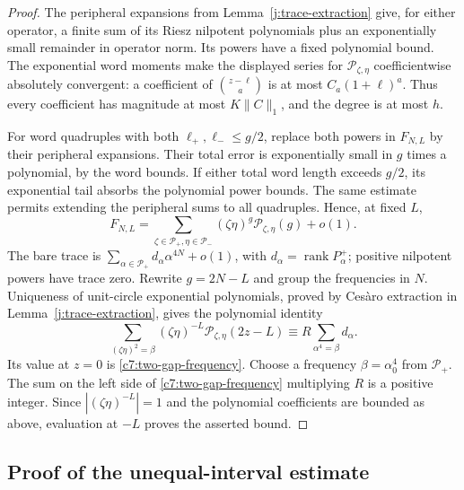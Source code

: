 \begin{proof}
The peripheral expansions from Lemma~\ref{j:trace-extraction} give,
for either operator, a finite sum of its Riesz nilpotent polynomials
plus an exponentially small remainder in operator norm. Its powers
have a fixed polynomial bound. The exponential word moments make the
displayed series for $\mathscr P_{\zeta,\eta}$ coefficientwise
absolutely convergent: a coefficient of $\binom{z-\ell}{a}$ is at most
$C_a(1+\ell)^a$. Thus every coefficient has magnitude at most
$K\|C\|_1$, and the degree is at most $h$.

For word quadruples with both $\ell_+,\ell_-\le g/2$, replace both
powers in $F_{N,L}$ by their peripheral expansions. Their total error
is exponentially small in $g$ times a polynomial, by the word bounds.
If either total word length exceeds $g/2$, its exponential tail absorbs
the polynomial power bounds. The same estimate permits extending the
peripheral sums to all quadruples. Hence, at fixed $L$,
\[
 F_{N,L}=\sum_{\zeta\in\mathcal P_+,\eta\in\mathcal P_-}
           (\zeta\eta)^g\mathscr P_{\zeta,\eta}(g)+o(1).
\]
The bare trace is
$\sum_{\alpha\in\mathcal P_+}d_\alpha\alpha^{4N}+o(1)$, with
$d_\alpha=\operatorname{rank}P_\alpha^+$; positive nilpotent powers
have trace zero. Rewrite $g=2N-L$ and group the frequencies in $N$.
Uniqueness of unit-circle exponential polynomials, proved by Ces\`aro
extraction in Lemma~\ref{j:trace-extraction}, gives the polynomial
identity
\[
 \sum_{(\zeta\eta)^2=\beta}(\zeta\eta)^{-L}
       \mathscr P_{\zeta,\eta}(2z-L)
 \equiv R\sum_{\alpha^4=\beta}d_\alpha.
\]
Its value at $z=0$ is \eqref{c7:two-gap-frequency}. Choose a frequency
$\beta=\alpha_0^4$ from $\mathcal P_+$. The sum on the left side of
\eqref{c7:two-gap-frequency} multiplying $R$ is a positive integer.
Since $|(\zeta\eta)^{-L}|=1$ and the polynomial coefficients are
bounded as above, evaluation at $-L$ proves the asserted bound.
\end{proof}

\subsection{Proof of the unequal-interval estimate}

